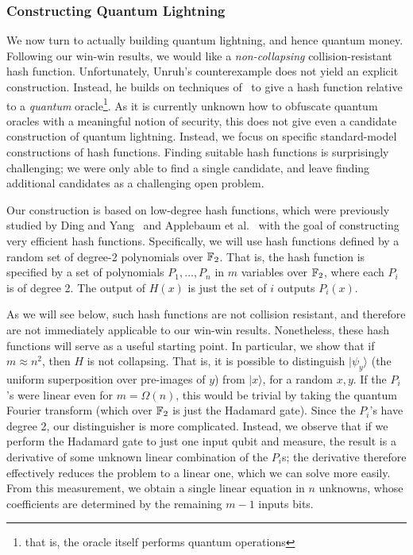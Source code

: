 \subsubsection{Constructing Quantum Lightning}


We now turn to actually building quantum lightning, and hence quantum money.  Following our win-win results, we would like a \emph{non-collapsing} collision-resistant hash function.  Unfortunately, Unruh's counterexample does not yield an explicit construction.  Instead, he builds on techniques of~\cite{FOCS:AmbRosUnr14} to give a hash function relative to a \emph{quantum} oracle\footnote{that is, the oracle itself performs quantum operations}.  As it is currently unknown how to obfuscate quantum oracles with a meaningful notion of security, this does not give even a candidate construction of quantum lightning.  Instead, we focus on specific standard-model constructions of hash functions.  Finding suitable hash functions is surprisingly challenging; we were only able to find a single candidate, and leave finding additional candidates as a challenging open problem.

Our construction is based on low-degree hash functions, which were previously studied by Ding and Yang~\cite{DingYang08} and Applebaum et al.~\cite{ITCS:AHIKV17} with the goal of constructing very efficient hash functions.  Specifically, we will use hash functions defined by a random set of degree-2 polynomials over ${\mathbb F}_2$.  That is, the hash function is specified by a set of polynomials $P_1,\dots,P_n$ in $m$ variables over ${\mathbb F}_2$, where each $P_i$ is of degree 2.  The output of $H(x)$ is just the set of $i$ outputs $P_i(x)$.  

As we will see below, such hash functions are not collision resistant, and therefore are not immediately applicable to our win-win results.  Nonetheless, these hash functions will serve as a useful starting point.  In particular, we show that if $m\approx n^2$, then $H$ is not collapsing.  That is, it is possible to distinguish $|\psi_y\rangle$ (the uniform superposition over pre-images of $y$) from $|x\rangle$, for a random $x,y$.  If the $P_i$'s were linear even for $m=\Omega(n)$, this would be trivial by taking the quantum Fourier transform (which over ${\mathbb F}_2$ is just the Hadamard gate).  Since the $P_i$'s have degree 2, our distinguisher is more complicated.  Instead, we observe that if we perform the Hadamard gate to just one input qubit and measure, the result is a derivative of some unknown linear combination of the $P_i$s; the derivative therefore effectively reduces the problem to a linear one, which we can solve more easily.  From this measurement, we obtain a single linear equation in $n$ unknowns, whose coefficients are determined by the remaining $m-1$ inputs bits.  


